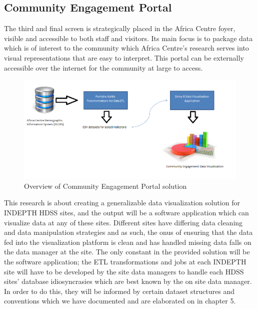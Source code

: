 \subsection{Community Engagement Portal}

The third and final screen is strategically placed in the Africa Centre foyer, visible and accessible to both staff and visitors. Its main focus is to package data which is of interest to the community which Africa Centre’s research serves into visual representations that are easy to interpret. This portal can be externally accessible over the internet for the community at large to access.

\begin{figure}[!ht] 
\centering
\includegraphics[scale=0.4]{./Chapter4/images/communityportaloverview}
\caption{Overview of Community Engagement Portal solution }
\label{fig3}
\end{figure}

This research is about creating a generalizable data visualization solution for INDEPTH HDSS sites, and the output will be a software application which can visualize data at any of these sites. Different sites have differing data cleaning and data manipulation strategies and as such, the onus of ensuring that the data fed into the visualization platform is clean and has handled missing data falls on the data manager at the site. The only constant in the provided solution will be the software application; the ETL transformations and jobs at each INDEPTH site will have to be developed by the site data managers to handle each HDSS sites’ database idiosyncrasies which are best known by the on site data manager. In order to do this, they will be informed by certain dataset structures and conventions which we have documented and are elaborated on in chapter 5.
